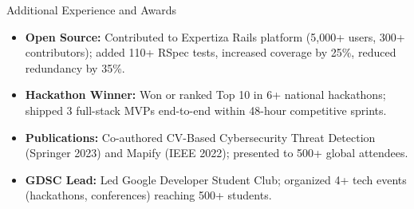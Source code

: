 \documentclass[]{mcdowellcv}
\begin{document}
\begin{cvsection}{Additional Experience and Awards}
  \begin{cvsubsection}{}{}{}
    \begin{itemize}
      \item \textbf{Open Source:} Contributed to Expertiza Rails platform (5,000+ users, 300+ contributors); added 110+ RSpec tests, increased coverage by 25\%, reduced redundancy by 35\%.
      \item \textbf{Hackathon Winner:} Won or ranked Top 10 in 6+ national hackathons; shipped 3 full-stack MVPs end-to-end within 48-hour competitive sprints.
      \item \textbf{Publications:} Co-authored CV-Based Cybersecurity Threat Detection (Springer 2023) and Mapify (IEEE 2022); presented to 500+ global attendees.
      \item \textbf{GDSC Lead:} Led Google Developer Student Club; organized 4+ tech events (hackathons, conferences) reaching 500+ students.
    \end{itemize}
  \end{cvsubsection}
\end{cvsection}
\end{document}
